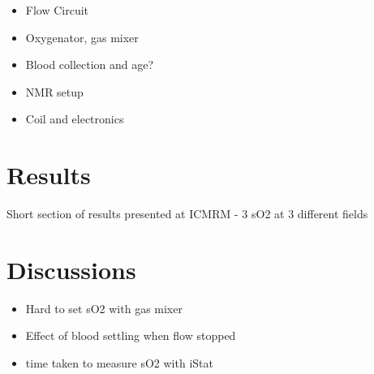 \begin{itemize}
\item Flow Circuit
\item Oxygenator, gas mixer
\item Blood collection and age?
\item NMR setup
\item Coil and electronics
\end{itemize}

\section{Results}
Short section of results presented at ICMRM - 3 sO2 at 3 different fields
\section{Discussions}

\begin{itemize}
\item Hard to set sO2 with gas mixer
\item Effect of blood settling when flow stopped
\item time taken to measure sO2 with iStat
\end{itemize}
